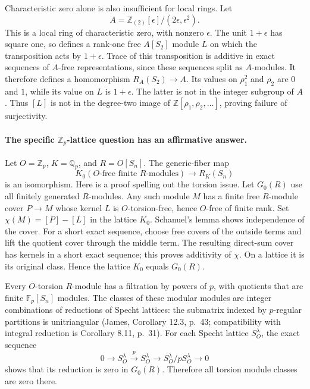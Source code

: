 \documentclass[11pt]{article}
\begin{document}
Characteristic zero alone is also insufficient for local rings.
Let
\[
 A=\mathbb Z_{(2)}[\epsilon]/(2\epsilon,\epsilon^2).
\]
This is a local ring of characteristic zero, with nonzero $\epsilon$.
The unit $1+\epsilon$ has square one, so defines a rank-one free
$A[S_2]$ module $L$ on which the transposition acts by $1+\epsilon$.
Trace of this transposition is additive in exact sequences of
$A$-free representations, since these sequences split as $A$-modules.
It therefore defines a homomorphism $R_A(S_2)\to A$. Its values on
$\rho_1^2$ and $\rho_2$ are $0$ and $1$, while its value on $L$ is
$1+\epsilon$. The latter is not in the integer subgroup of $A$.
Thus $[L]$ is not in the degree-two image of
$\mathbb Z[\rho_1,\rho_2,\ldots]$, proving failure of surjectivity.

\paragraph{The specific $\mathbb Z_p$-lattice question has an affirmative answer.}
Let $O=\mathbb Z_p$, $K=\mathbb Q_p$, and $R=O[S_n]$. The generic-fiber
map
\[
 K_0(\text{$O$-free finite $R$-modules})\longrightarrow R_K(S_n)
\]
is an isomorphism. Here is a proof spelling out the torsion issue.
Let $G_0(R)$ use all finitely generated $R$-modules. Any such module
$M$ has a finite free $R$-module cover $P\to M$ whose kernel $L$ is
$O$-torsion-free, hence $O$-free of finite rank. Set
$\chi(M)=[P]-[L]$ in the lattice $K_0$. Schanuel's lemma shows
independence of the cover. For a short exact sequence, choose free
covers of the outside terms and lift the quotient cover through the
middle term. The resulting direct-sum cover has kernels in a short
exact sequence; this proves additivity of $\chi$. On a lattice it
is its original class. Hence the lattice $K_0$ equals $G_0(R)$.

Every $O$-torsion $R$-module has a filtration by powers of $p$, with
quotients that are finite $\mathbb F_p[S_n]$ modules. The classes of
these modular modules are integer combinations of reductions of
Specht lattices: the submatrix indexed by $p$-regular partitions is
unitriangular (James, Corollary 12.3, p.~43; compatibility with
integral reduction is Corollary 8.11, p.~31). For each Specht lattice
$S_O^\lambda$, the exact sequence
\[
 0\longrightarrow S_O^\lambda\xrightarrow{p}S_O^\lambda
 \longrightarrow S_O^\lambda/pS_O^\lambda\longrightarrow0
\]
shows that its reduction is zero in $G_0(R)$. Therefore all torsion
module classes are zero there.
\end{document}
